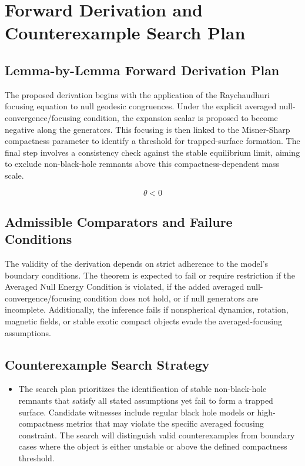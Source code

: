 \documentclass[conference]{IEEEtran}
\begin{document}
\section{Forward Derivation and Counterexample Search Plan}
\subsection{Lemma-by-Lemma Forward Derivation Plan}
The proposed derivation begins with the application of the Raychaudhuri focusing equation to null geodesic congruences. Under the explicit averaged null-convergence/focusing condition, the expansion scalar is proposed to become negative along the generators. This focusing is then linked to the Misner-Sharp compactness parameter to identify a threshold for trapped-surface formation. The final step involves a consistency check against the stable equilibrium limit, aiming to exclude non-black-hole remnants above this compactness-dependent mass scale.

\[
\theta < 0
\]

\subsection{Admissible Comparators and Failure Conditions}
The validity of the derivation depends on strict adherence to the model's boundary conditions. The theorem is expected to fail or require restriction if the Averaged Null Energy Condition is violated, if the added averaged null-convergence/focusing condition does not hold, or if null generators are incomplete. Additionally, the inference fails if nonspherical dynamics, rotation, magnetic fields, or stable exotic compact objects evade the averaged-focusing assumptions.

\subsection{Counterexample Search Strategy}
\begin{itemize}
\item The search plan prioritizes the identification of stable non-black-hole remnants that satisfy all stated assumptions yet fail to form a trapped surface. Candidate witnesses include regular black hole models or high-compactness metrics that may violate the specific averaged focusing constraint. The search will distinguish valid counterexamples from boundary cases where the object is either unstable or above the defined compactness threshold.
\end{itemize}
\end{document}
